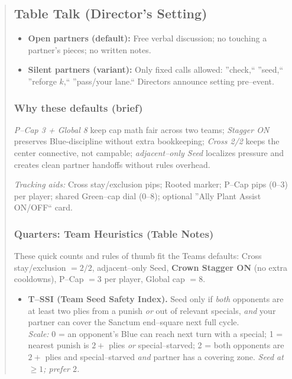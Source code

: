 \documentclass[11pt]{article}
\begin{document}
\begin{quote}
\subsection*{Table Talk (Director's Setting)}
\begin{itemize}[leftmargin=1.3em,itemsep=0.2em]
  \item \textbf{Open partners (default):} Free verbal discussion; no touching a partner's pieces; no written notes.
  \item \textbf{Silent partners (variant):} Only fixed calls allowed: ''check,`` ''seed,`` ''reforge $k$,`` ''pass/your lane.`` Directors announce setting pre--event.
\end{itemize}

\subsubsection*{Why these defaults (brief)}
\noindent \emph{P--Cap 3 + Global 8} keep cap math fair across two teams; \emph{Stagger ON} preserves Blue-discipline without extra bookkeeping; \emph{Cross 2/2} keeps the center connective, not campable; \emph{adjacent--only Seed} localizes pressure and creates clean partner handoffs without rules overhead.

\medskip
\noindent\textit{Tracking aids:} Cross stay/exclusion pips; Rooted marker; P--Cap pips (0--3) per player; shared Green--cap dial (0--8); optional ''Ally Plant Assist ON/OFF`` card.


\subsubsection*{Quarters: Team Heuristics (Table Notes)}
\label{sec:teams-heuristics}

\noindent These quick counts and rules of thumb fit the Teams defaults: Cross stay/exclusion $=2/2$, adjacent--only Seed, \textbf{Crown Stagger ON} (no extra cooldowns), P--Cap $=3$ per player, Global cap $=8$.

\medskip
\begin{itemize}[leftmargin=1.3em,itemsep=0.3em]

  \item \textbf{T--SSI (Team Seed Safety Index).}
  Seed only if \emph{both} opponents are at least two plies from a punish \emph{or} out of relevant specials, \emph{and} your partner can cover the Sanctum end--square next full cycle.\\
  \emph{Scale:} 0 = an opponent's Blue can reach next turn with a special; 1 = nearest punish is $2+$ plies \emph{or} special--starved; 2 = both opponents are $2+$ plies and special--starved \emph{and} partner has a covering zone. \emph{Seed at $\ge 1$; prefer $2$.}


\end{itemize}
\end{quote}
\end{document}
